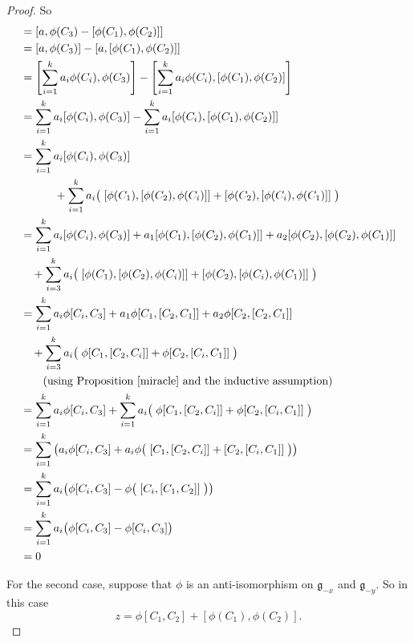 \documentclass[honours]{UNSWthesis}
\newcommand{\g}{\mathfrak{g}}
\newcommand{\1}{\mathbf{e}_{1}}
\newcommand{\2}{\mathbf{e}_{3}}
\newcommand{\3}{\mathbf{e}_{3}}
\begin{document}
\begin{proof}
So
\begin{align*}
[a,z] &= [a,\phi(C_{3})-[\phi(C_{1}),\phi(C_{2})]] \\
&=[a,\phi(C_{3})]-[a,[\phi(C_{1}),\phi(C_{2})]] \\
&=\left[\sum\limits_{i=1}^{k} a_{i}\phi(C_{i}),\phi(C_{3}) \right]-\left[ \sum\limits_{i=1}^{k} a_{i}\phi(C_{i}),[\phi(C_{1}),\phi(C_{2})]\right] \\
&=\sum\limits_{i=1}^{k} a_{i}[\phi(C_{i}),\phi(C_{3})]-\sum\limits_{i=1}^{k} a_{i}[\phi(C_{i}),[\phi(C_{1}),\phi(C_{2})]] \\
&=\sum\limits_{i=1}^{k} a_{i}[\phi(C_{i}),\phi(C_{3})]\\
&\quad \quad \quad+ \sum\limits_{i=1}^{k} a_{i}\big(\; [\phi(C_{1}),[\phi(C_{2}),\phi(C_{i})]]+[\phi(C_{2}),[\phi(C_{i}),\phi(C_{1})]]\;\big) \\
&=\sum\limits_{i=1}^{k} a_{i}[\phi(C_{i}),\phi(C_{3})]+a_{1}[\phi(C_{1}),[\phi(C_{2}),\phi(C_{1})]]+a_{2}[\phi(C_{2}),[\phi(C_{2}),\phi(C_{1})]] \\
&\quad+ \sum\limits_{i=3}^{k} a_{i}\big(\; [\phi(C_{1}),[\phi(C_{2}),\phi(C_{i})]]+[\phi(C_{2}),[\phi(C_{i}),\phi(C_{1})]] \;\big) \\
&=\sum\limits_{i=1}^{k} a_{i}\phi[C_{i},C_{3}]+a_{1}\phi[C_{1},[C_{2},C_{1}]]+a_{2}\phi[C_{2},[C_{2},C_{1}]] \\
&\quad+ \sum\limits_{i=3}^{k} a_{i}\big(\; \phi[C_{1},[C_{2},C_{i}]]+\phi[C_{2},[C_{i},C_{1}]] \;\big) \\
& \quad \quad \text{(using Proposition \ref{miracle} and the inductive assumption) } \\
&=\sum\limits_{i=1}^{k} a_{i}\phi[C_{i},C_{3}]+ \sum\limits_{i=1}^{k} a_{i}\big(\; \phi[C_{1},[C_{2},C_{i}]]+\phi[C_{2},[C_{i},C_{1}]] \;\big) \\
&=\sum\limits_{i=1}^{k} \big( a_{i}\phi[C_{i},C_{3}]+ a_{i}\phi\big(\; [C_{1},[C_{2},C_{i}]]+[C_{2},[C_{i},C_{1}]] \;\big)\big) \\
&=\sum\limits_{i=1}^{k} a_{i}\big(\phi[C_{i},C_{3}]- \phi\big(\; [C_{i},[C_{1},C_{2}]] \;\big)\big) \\
&=\sum\limits_{i=1}^{k} a_{i}\big(\phi[C_{i},C_{3}]- \phi[C_{i},C_{3}] \big) \\
&=0
\end{align*}

For the second case, suppose that $\phi$ is an anti-isomorphism on $\g_{-x}$ and $\g_{-y}$. So in this case
\[
z=\phi[C_{1},C_{2}]+[\phi(C_{1}),\phi(C_{2})].
\]


\end{proof}
\end{document}
